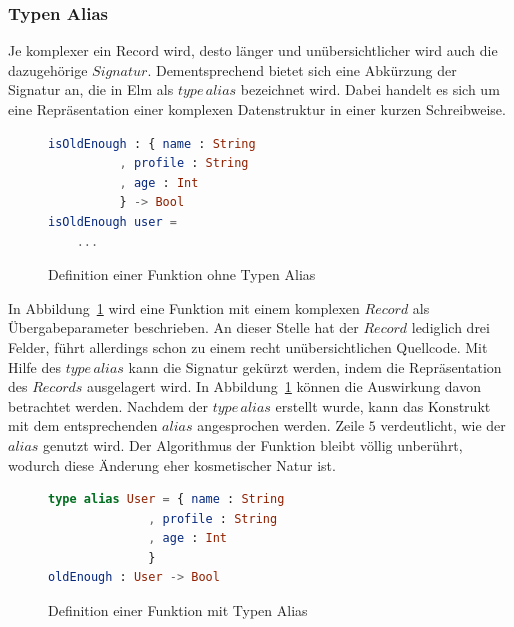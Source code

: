 \subsubsection{Typen Alias}
\label{sec:typ-alias}
Je komplexer ein Record wird, desto länger und unübersichtlicher wird auch die dazugehörige $Signatur$. Dementsprechend bietet sich eine Abkürzung der Signatur an, die in Elm als $type\,alias$ bezeichnet wird. Dabei handelt es sich um eine Repräsentation einer komplexen Datenstruktur in einer kurzen Schreibweise.
\begin{figure}[h]
\begin{lstlisting}[language=Elm]
isOldEnough : { name : String
	      , profile : String
	      , age : Int 
	      } -> Bool
isOldEnough user =
	...
\end{lstlisting}
\caption{Definition einer Funktion ohne Typen Alias}\label{fig:no-type-alias}
\end{figure}
In Abbildung~\ref{fig:no-type-alias} wird eine Funktion mit einem komplexen $Record$ als Übergabeparameter beschrieben. An dieser Stelle hat der $Record$ lediglich drei Felder, führt allerdings schon zu einem recht unübersichtlichen Quellcode. Mit Hilfe des $type\,alias$ kann die Signatur gekürzt werden, indem die Repräsentation des $Records$ ausgelagert wird. In Abbildung~\ref{fig:no-type-alias} können die Auswirkung davon betrachtet werden. Nachdem der $type\,alias$ erstellt wurde, kann das Konstrukt mit dem entsprechenden $alias$ angesprochen werden. Zeile $5$ verdeutlicht, wie der $alias$ genutzt wird. Der Algorithmus der Funktion bleibt völlig unberührt, wodurch diese Änderung eher kosmetischer Natur ist.
\begin{figure}[h]
\begin{lstlisting}[language=Elm]
type alias User = { name : String
	          , profile : String
	          , age : Int
	          }
oldEnough : User -> Bool
\end{lstlisting}
\caption{Definition einer Funktion mit Typen Alias}\label{fig:type-alias}
\end{figure}

